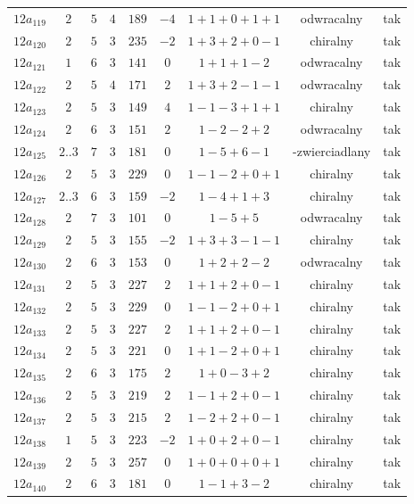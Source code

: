 \begin{longtable}{ccccccccc}
$12a_{119}$ & $2$ & $5$ & $4$ & $189$ & $-4$ & $1+1+0+1+1$ & odwracalny & tak \\
$12a_{120}$ & $2$ & $5$ & $3$ & $235$ & $-2$ & $1+3+2+0-1$ & chiralny & tak \\
$12a_{121}$ & $1$ & $6$ & $3$ & $141$ & $0$ & $1+1+1-2$ & odwracalny & tak \\
$12a_{122}$ & $2$ & $5$ & $4$ & $171$ & $2$ & $1+3+2-1-1$ & odwracalny & tak \\
$12a_{123}$ & $2$ & $5$ & $3$ & $149$ & $4$ & $1-1-3+1+1$ & chiralny & tak \\
$12a_{124}$ & $2$ & $6$ & $3$ & $151$ & $2$ & $1-2-2+2$ & odwracalny & tak \\
$12a_{125}$ & $2..3$ & $7$ & $3$ & $181$ & $0$ & $1-5+6-1$ & -zwierciadlany & tak \\
$12a_{126}$ & $2$ & $5$ & $3$ & $229$ & $0$ & $1-1-2+0+1$ & chiralny & tak \\
$12a_{127}$ & $2..3$ & $6$ & $3$ & $159$ & $-2$ & $1-4+1+3$ & chiralny & tak \\
$12a_{128}$ & $2$ & $7$ & $3$ & $101$ & $0$ & $1-5+5$ & odwracalny & tak \\
$12a_{129}$ & $2$ & $5$ & $3$ & $155$ & $-2$ & $1+3+3-1-1$ & chiralny & tak \\
$12a_{130}$ & $2$ & $6$ & $3$ & $153$ & $0$ & $1+2+2-2$ & odwracalny & tak \\
$12a_{131}$ & $2$ & $5$ & $3$ & $227$ & $2$ & $1+1+2+0-1$ & chiralny & tak \\
$12a_{132}$ & $2$ & $5$ & $3$ & $229$ & $0$ & $1-1-2+0+1$ & chiralny & tak \\
$12a_{133}$ & $2$ & $5$ & $3$ & $227$ & $2$ & $1+1+2+0-1$ & chiralny & tak \\
$12a_{134}$ & $2$ & $5$ & $3$ & $221$ & $0$ & $1+1-2+0+1$ & chiralny & tak \\
$12a_{135}$ & $2$ & $6$ & $3$ & $175$ & $2$ & $1+0-3+2$ & chiralny & tak \\
$12a_{136}$ & $2$ & $5$ & $3$ & $219$ & $2$ & $1-1+2+0-1$ & chiralny & tak \\
$12a_{137}$ & $2$ & $5$ & $3$ & $215$ & $2$ & $1-2+2+0-1$ & chiralny & tak \\
$12a_{138}$ & $1$ & $5$ & $3$ & $223$ & $-2$ & $1+0+2+0-1$ & chiralny & tak \\
$12a_{139}$ & $2$ & $5$ & $3$ & $257$ & $0$ & $1+0+0+0+1$ & chiralny & tak \\
$12a_{140}$ & $2$ & $6$ & $3$ & $181$ & $0$ & $1-1+3-2$ & chiralny & tak \\

\end{longtable}

